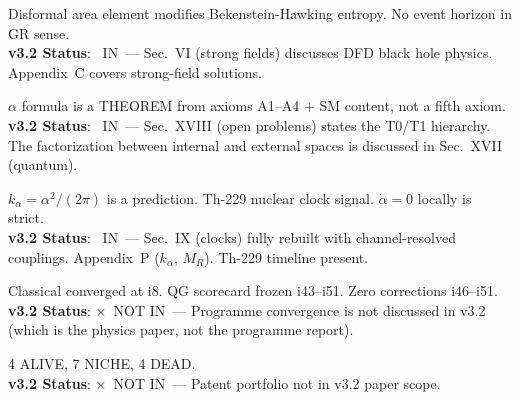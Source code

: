 \documentclass[11pt,a4paper]{article}
\newcommand{\vin}{\textcolor{statusIN}{\checkmark~IN}}
\newcommand{\vnot}{\textcolor{statusNOT}{$\times$~NOT IN}}
\begin{document}
\begin{tcolorbox}[colback=technical!5,colframe=technical,title=\textbf{F45: Black Hole Physics --- Shadow $+4.6\%$, Information Paradox Dissolved}]
Disformal area element modifies Bekenstein-Hawking entropy. No event horizon in GR sense.\\
\textbf{v3.2 Status}: \vin\ --- Sec.~VI (strong fields) discusses DFD black hole physics. Appendix~C covers strong-field solutions.
\end{tcolorbox}

\begin{tcolorbox}[colback=technical!5,colframe=technical,title=\textbf{F46: Quantum Gravity Implications of $\alpha$ Formula}]
$\alpha$ formula is a THEOREM from axioms A1--A4 + SM content, not a fifth axiom.\\
\textbf{v3.2 Status}: \vin\ --- Sec.~XVIII (open problems) states the T0/T1 hierarchy. The factorization between internal and external spaces is discussed in Sec.~XVII (quantum).
\end{tcolorbox}

\begin{tcolorbox}[colback=technical!5,colframe=technical,title=\textbf{F47: Clock Predictions --- $\dot{\alpha}/\alpha = 0$ Locally}]
$k_\alpha = \alpha^2/(2\pi)$ is a prediction. Th-229 nuclear clock signal. $\dot{\alpha} = 0$ locally is strict.\\
\textbf{v3.2 Status}: \vin\ --- Sec.~IX (clocks) fully rebuilt with channel-resolved couplings. Appendix~P ($k_\alpha$, $M_R$). Th-229 timeline present.
\end{tcolorbox}

\begin{tcolorbox}[colback=technical!5,colframe=technical,title=\textbf{F48: Convergence of the Research Programme}]
Classical converged at i8. QG scorecard frozen i43--i51. Zero corrections i46--i51.\\
\textbf{v3.2 Status}: \vnot\ --- Programme convergence is not discussed in v3.2 (which is the physics paper, not the programme report).
\end{tcolorbox}

\begin{tcolorbox}[colback=technical!5,colframe=technical,title=\textbf{F49: Patent Triage --- Final Portfolio}]
4 ALIVE, 7 NICHE, 4 DEAD.\\
\textbf{v3.2 Status}: \vnot\ --- Patent portfolio not in v3.2 paper scope.
\end{tcolorbox}
\end{document}
